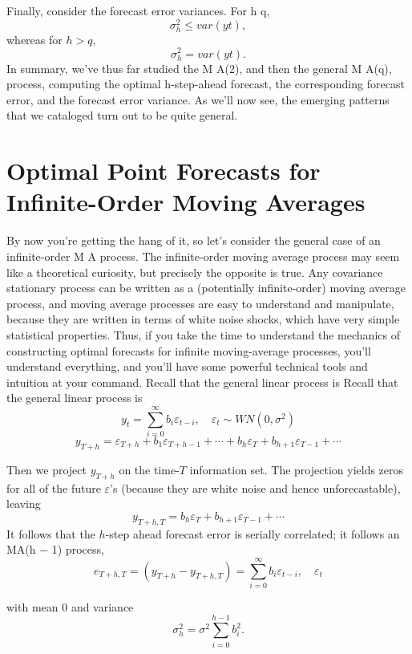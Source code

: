 \documentclass[]{article}
\begin{document}
Finally, consider the forecast error variances. For h \leq q,
\[\sigma_h^2  \leq var(y t ),\] whereas for \(h > q\),
\[\sigma_h^2  = var(y t ).\] In summary, we've thus far studied the M
A(2), and then the general M A(q), process, computing the optimal
h-step-ahead forecast, the corresponding forecast error, and the
forecast error variance. As we'll now see, the emerging patterns that we
cataloged turn out to be quite general.

\hypertarget{optimal-point-forecasts-for-infinite-order-moving-averages}{%
\section{Optimal Point Forecasts for Infinite-Order Moving
Averages}\label{optimal-point-forecasts-for-infinite-order-moving-averages}}

By now you're getting the hang of it, so let's consider the general case
of an infinite-order M A process. The infinite-order moving average
process may seem like a theoretical curiosity, but precisely the
opposite is true. Any covariance stationary process can be written as a
(potentially infinite-order) moving average process, and moving average
processes are easy to understand and manipulate, because they are
written in terms of white noise shocks, which have very simple
statistical properties. Thus, if you take the time to understand the
mechanics of constructing optimal forecasts for infinite moving-average
processes, you'll understand everything, and you'll have some powerful
technical tools and intuition at your command. Recall that the general
linear process is Recall that the general linear process is
\[y_t=\sum_{i=0}^\infty b_i\varepsilon_{t-i}, \quad \varepsilon_t\sim WN(0,\sigma^2)\]
\[y_{T +h} = \varepsilon_{T +h} + b_1 \varepsilon_{T +h−1} + \cdots + b_h \varepsilon_T + b_{h+1} \varepsilon_{T −1} + \cdots\]

Then we project \(y_{T +h}\) on the time-\(T\) information set. The
projection yields zeros for all of the future \(\varepsilon\)'s (because
they are white noise and hence unforecastable), leaving
\[y_{ T +h,T} = b_h \varepsilon_T + b_{h+1} \varepsilon _{T −1} + \cdots\]
It follows that the \(h\)-step ahead forecast error is serially
correlated; it follows an MA(h − 1) process,
\[e_{ T +h,T} = (y_{T +h} − y_{ T +h,T} ) =\sum_{i=0}^\infty b_i\varepsilon_{t-i}, \quad \varepsilon_t\]

with mean 0 and variance
\[\sigma _h^2=\sigma ^ 2\sum_{i=0}^{h-1} b_i^2.\]
\end{document}
